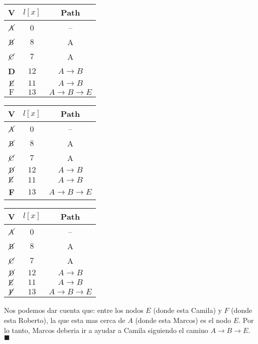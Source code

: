 \documentclass[legalpaper,10pt]{article}
\begin{document}
\begin{enumerate}
\begin{enumerate}
\begin{center}
    \begin{tabular}{|c|c|c|}
      \hline
      V&$l[x]$&Path\\
      \hline
      $\cancel{\text{A}}$ & 0 & -- \\
      $\cancel{\text{B}}$ & $8$ & A         \\
      $\cancel{\text{C}}$ & $7$ & A         \\
      \textbf{D} & $12$ & $A \rightarrow B$   \\
      $\cancel{\text{E}}$ & $11$ & $A \rightarrow B$        \\
      $\text{F}$ & $13$ & $A \rightarrow B \rightarrow E$        \\
      \hline
    \end{tabular}
    \quad
    \begin{tabular}{|c|c|c|}
      \hline
      V&$l[x]$&Path\\
      \hline
      $\cancel{\text{A}}$ & 0 & -- \\
      $\cancel{\text{B}}$ & $8$ & A         \\
      $\cancel{\text{C}}$ & $7$ & A         \\
      $\cancel{\text{D}}$ & $12$ & $A \rightarrow B$   \\
      $\cancel{\text{E}}$ & $11$ & $A \rightarrow B$        \\
      \textbf{F} & $13$ & $A \rightarrow B \rightarrow E$        \\
      \hline
    \end{tabular}
    \quad
    \begin{tabular}{||c|c|c||}
      \hline \hline
      V&$l[x]$&Path\\
      \hline
      $\cancel{\text{A}}$ & 0 & -- \\
      $\cancel{\text{B}}$ & $8$ & A         \\
      $\cancel{\text{C}}$ & $7$ & A         \\
      $\cancel{\text{D}}$ & $12$ & $A \rightarrow B$   \\
      $\cancel{\text{E}}$ & $11$ & $A \rightarrow B$        \\
      $\cancel{\text{F}}$ & $13$ & $A \rightarrow B \rightarrow E$        \\
      \hline \hline
    \end{tabular}
  \end{center}

  Nos podemos dar cuenta que: entre los nodos $E$ (donde esta Camila) y $F$ (donde esta Roberto), la que esta mas cerca de $A$ (donde esta Marcos) es el nodo $E$. Por lo tanto, Marcos deberia ir a ayudar a Camila siguiendo el camino $A \rightarrow B \rightarrow E$. \hfill \(\blacksquare\)


\end{enumerate}
\end{enumerate}
\end{document}
